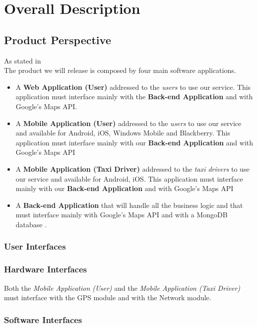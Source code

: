\documentclass[12pt, a4paper]{article}
\begin{document}
\section{Overall Description}
\subsection{Product Perspective}
As stated in \\
The product we will release is composed by four main software applications.
\begin{itemize}
  \item A \textbf{Web Application (User)} addressed to the \emph{users}  to use our service. This application must interface mainly with the \textbf{Back-end Application} and with Google's Maps API.
  \item A \textbf{Mobile Application (User)} addressed to the \emph{users} to use our service and available for Android, iOS, Windows Mobile and Blackberry. This application must interface mainly with our \textbf{Back-end Application} and with Google's Maps API
  \item A \textbf{Mobile Application (Taxi Driver)} addressed to the \emph{taxi drivers} to use our service and available for Android, iOS. This application must interface mainly with our \textbf{Back-end Application} and with Google's Maps API

  \item A \textbf{Back-end Application} that will handle all the business logic and that must interface mainly with Google's Maps API and with a MongoDB database .
\end{itemize}

\subsubsection{User Interfaces}
\subsubsection{Hardware Interfaces}
Both the \emph{Mobile Application (User)} and the \emph{Mobile Application (Taxi Driver)} must interface with the GPS module and with the Network module.\\

\subsubsection{Software Interfaces}
\end{document}
